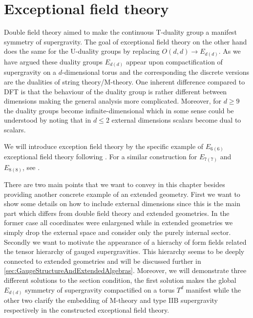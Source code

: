 \chapter{Exceptional field theory\label{chap:ExceptionalFieldTheory}}

Double field theory aimed to make the continuous T-duality group a manifest symmetry of supergravity. The goal of exceptional field theory on the other hand does the same for the U-duality groups by replacing $O(d,d)\to E_{d(d)}$. As we have argued these duality groups $E_{d(d)}$ appear upon compactification of supergravity on a $d$-dimensional torus and the corresponding the discrete versions are the dualities of string theory/M-theory. One inherent difference compared to DFT is that the behaviour of the duality group is rather different between dimensions making the general analysis more complicated. Moreover, for $d\geq 9$ the duality groups become infinite-dimensional which in some sense could be understood by noting that in $d\leq 2$ external dimensions scalars become dual to scalars. %

We will introduce exception field theory by the specific example of $E_{6(6)}$ exceptional field theory following \cite{E62014}. For a similar construction for $E_{7(7)}$ and $E_{8(8)}$, see \cite{E72014,E82014}. 

There are two main points that we want to convey in this chapter besides providing another concrete example of an extended geometry. First we want to show some details on how to include external dimensions since this is the main part which differs from double field theory and extended geometries. In the former case all coordinates were enlargened while in extended geometries we simply drop the external space and consider only the purely internal sector. Secondly we want to motivate the appearance of a hierachy of form fields related the tensor hierarchy of gauged supergravities. This hierarchy seems to be deeply connected to extended geometries and will be discussed further in \ref{sec:GaugeStructureAndExtendedAlgebras}. Moreover, we will demonstrate three different solutions to the section condition, the first solution makes the global $E_{d(d)}$ symmetry of supergravity compactified on a torus $T^d$ manifest while the other two clarify the embedding of M-theory and type IIB supergravity respectively in the constructed exceptional field theory. 

